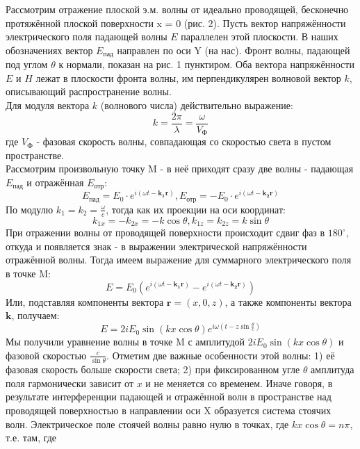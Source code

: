 \documentclass[a4paper,12pt]{article}
\begin{document}
Рассмотрим отражение плоской э.м. волны от идеально проводящей,
бесконечно протяжённой плоской поверхности x = 0 (рис. 2). Пусть вектор напряжённости электрического поля падающей волны $E$ параллелен
этой плоскости. В наших обозначениях вектор $E_{пад}$ направлен по оси Y
(на нас). Фронт волны, падающей под углом $\theta$ к нормали, показан на
рис. 1 пунктиром. Оба вектора напряжённости $E$ и $H$ лежат в плоскости
фронта волны, им перпендикулярен волновой вектор $k$, описывающий
распространение волны.\\
Для модуля вектора $k$ (волнового числа) действительно выражение:
\begin{equation}
    k = \frac{2\pi}{\lambda} = \frac{\omega}{V_{\text{Ф}}}
\end{equation}
где $V_{\text{Ф}}$ - фазовая скорость волны, совпадающая со скоростью света в пустом пространстве.\\
Рассмотрим произвольную точку M - в неё приходят сразу две волны - падающая $E_{\text{пад}}$ и отражённая $E_{\text{отр}}$:
\begin{equation}
    E_{\text{пад}} = E_0 \cdot e^{i(\omega t - \mathbf{k_1 r})}, E_{\text{отр}} = - E_0 \cdot e^{i(\omega t - \mathbf{k_2 r})}
\end{equation}
По модулю $k_1 = k_2 = \frac{\omega}{c}$, тогда как их проекции на оси координат:
\begin{equation}
    k_{1x} = -k_{2x} = -k \cos \theta, k_{1z} = k_{2z} = k \sin \theta
\end{equation}
При отражении волны от проводящей поверхности происходит сдвиг фаз в $180^{\circ}$, откуда и появляется знак - в выражении электрической напряжённости отражённой волны.
Тогда имеем выражение для суммарного электрического поля в точке M:
\begin{equation}
    E = E_0 (e^{i(\omega t - \mathbf{k_1 r})} - e^{i(\omega t - \mathbf{k_2 r})})
\end{equation}
Или, подставляя компоненты вектора $\mathbf{r} = (x, 0, z)$, а также компоненты вектора $\mathbf{k}$, получаем:
\begin{equation}
    E = 2i E_0 \sin(k x \cos \theta) e^{i \omega (t - z \sin{\frac{\theta}{c}})}
\end{equation}
Мы получили уравнение волны в точке M с амплитудой $2 i E_0 \sin (k x \cos \theta)$ и фазовой скоростью $\frac{c}{\sin \theta}$.
Отметим две важные особенности этой волны: 1) её фазовая скорость
больше скорости света; 2) при фиксированном угле $\theta$ амплитуда поля
гармонически зависит от $x$ и не меняется со временем. Иначе говоря, в результате интерференции падающей и отражённой волн в пространстве над проводящей поверхностью в направлении оси X образуется система стоячих волн. Электрическое поле стоячей волны равно нулю в точках, где $k x \cos \theta = n \pi$, т.е. там, где
\end{document}
